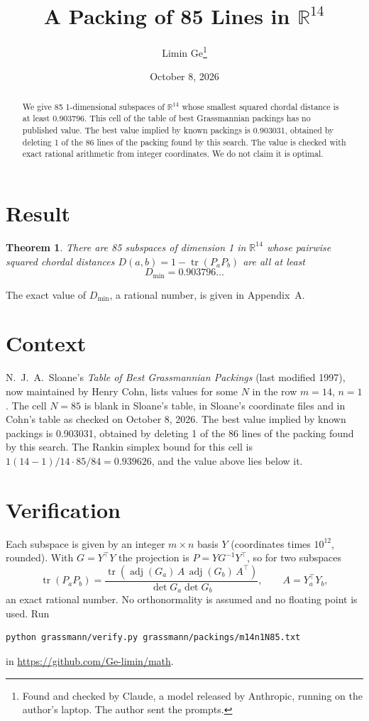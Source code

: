 \documentclass[11pt,a4paper]{article}
\title{A Packing of 85 Lines in $\mathbb{R}^{14}$}
\author{Limin Ge\thanks{Found and checked by Claude, a model released by Anthropic, running on the author's laptop. The author sent the prompts.}}
\date{October 8, 2026}
\newtheorem*{theorem}{Theorem}
\begin{document}
\maketitle
\begin{abstract}
We give 85 1-dimensional subspaces of $\mathbb{R}^{14}$ whose smallest squared chordal distance is at least 0.903796. This cell of the table of best Grassmannian packings has no published value. The best value implied by known packings is 0.903031, obtained by deleting 1 of the 86 lines of the packing found by this search. The value is checked with exact rational arithmetic from integer coordinates. We do not claim it is optimal.
\end{abstract}

\section{Result}
\begin{theorem}
There are 85 subspaces of dimension 1 in $\mathbb{R}^{14}$ whose pairwise squared chordal distances $D(a,b) = 1 - \operatorname{tr}(P_aP_b)$ are all at least
\[ D_{\min} = 0.903796\ldots \]
\end{theorem}
The exact value of $D_{\min}$, a rational number, is given in Appendix~A.


\section{Context}
N.~J.~A.~Sloane's \emph{Table of Best Grassmannian Packings} (last modified 1997), now maintained by Henry Cohn, lists values for some $N$ in the row $m=14$, $n=1$. The cell $N=85$ is blank in Sloane's table, in Sloane's coordinate files and in Cohn's table as checked on October 8, 2026. The best value implied by known packings is 0.903031, obtained by deleting 1 of the 86 lines of the packing found by this search. The Rankin simplex bound for this cell is $1(14-1)/14\cdot 85/84 = 0.939626$, and the value above lies below it.


\section{Verification}
Each subspace is given by an integer $m\times n$ basis $Y$ (coordinates times $10^{12}$, rounded). With $G=Y^\top Y$ the projection is $P=YG^{-1}Y^\top$, so for two subspaces
\[ \operatorname{tr}(P_aP_b)=\frac{\operatorname{tr}(\operatorname{adj}(G_a)\,A\,\operatorname{adj}(G_b)\,A^\top)}{\det G_a\det G_b},\qquad A=Y_a^\top Y_b, \]
an exact rational number. No orthonormality is assumed and no floating point is used. Run
\begin{verbatim}
python grassmann/verify.py grassmann/packings/m14n1N85.txt
\end{verbatim}
in \url{https://github.com/Ge-limin/math}.
\end{document}
